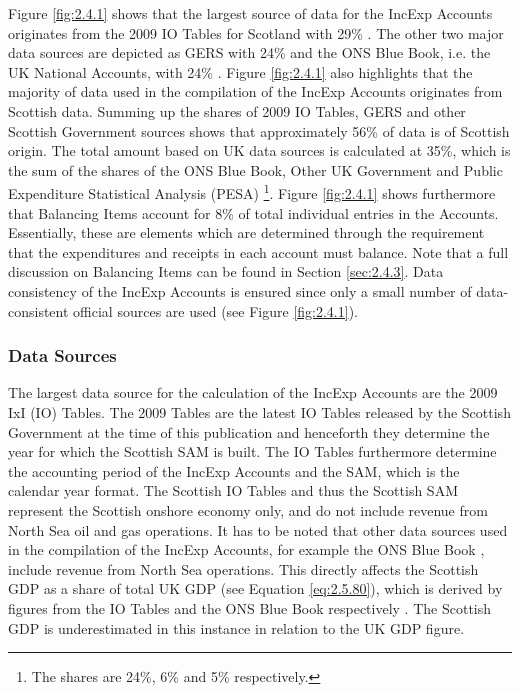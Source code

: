 Figure \ref{fig:2.4.1} shows that the largest source of data for the IncExp Accounts originates from the 2009 IO Tables for Scotland with 29\% \cite{ScotGov2013a}. The other two major data sources are depicted as GERS with 24\% \cite{ScotGov2013b} and the ONS Blue Book, i.e. the UK National Accounts, with 24\% \cite{ONS2011c}. Figure \ref{fig:2.4.1} also highlights that the majority of data used in the compilation of the IncExp Accounts originates from Scottish data. Summing up the shares of 2009 IO Tables, GERS and other Scottish Government sources shows that approximately 56\% of data is of Scottish origin. The total amount based on UK data sources is calculated at 35\%, which is the sum of the shares of the ONS Blue Book, Other UK Government and Public Expenditure Statistical Analysis (PESA) \cite{HMTR2012}\footnote{The shares are 24\%, 6\% and 5\% respectively.}. Figure \ref{fig:2.4.1}  shows furthermore that Balancing Items account for 8\% of total individual entries in the Accounts. Essentially, these are elements which are determined through the requirement that the expenditures and receipts in each account must balance. Note that a full discussion on Balancing Items can be found in Section \ref{sec:2.4.3}. Data consistency of the IncExp Accounts is ensured since only a small number of data-consistent official sources are used (see Figure \ref{fig:2.4.1}).

\bigskip

\subsubsection{Data Sources}

The largest data source for the calculation of the IncExp Accounts are the 2009 IxI (IO) Tables. The 2009 Tables are the latest IO Tables released by the Scottish Government at the time of this publication and henceforth they determine the year for which the Scottish SAM is built. The IO Tables furthermore determine the accounting period of the IncExp Accounts and the SAM, which is the calendar year format. The Scottish IO Tables and thus the Scottish SAM represent the Scottish onshore economy only, and do not include revenue from North Sea oil and gas operations. It has to be noted that other data sources used in the compilation of the IncExp Accounts, for example the ONS Blue Book \cite{ONS2011c}, include revenue from North Sea operations. This directly affects the Scottish GDP as a share of total UK GDP (see Equation \ref{eq:2.5.80}), which is derived by figures from the IO Tables and the ONS Blue Book respectively \cite{ScotGov2013a, ONS2011c}. The Scottish GDP is underestimated in this instance in relation to the UK GDP figure. 

